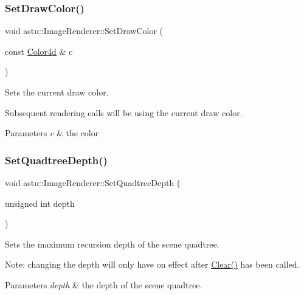 \subsubsection{\texorpdfstring{Set\+Draw\+Color()}{SetDrawColor()}}
{\footnotesize\ttfamily void astu\+::\+Image\+Renderer\+::\+Set\+Draw\+Color (\begin{DoxyParamCaption}\item[{const \hyperlink{classastu_1_1Color}{Color4d} \&}]{c }\end{DoxyParamCaption})\hspace{0.3cm}{\ttfamily [noexcept]}}

Sets the current draw color.

Subsequent rendering calls will be using the current draw color.


\begin{DoxyParams}{Parameters}
{\em c} & the color \\
\hline
\end{DoxyParams}
\mbox{\label{classastu_1_1ImageRenderer_af40c3c01ee3928fb7a8be816afe20eb5}} 
\subsubsection{\texorpdfstring{Set\+Quadtree\+Depth()}{SetQuadtreeDepth()}}
{\footnotesize\ttfamily void astu\+::\+Image\+Renderer\+::\+Set\+Quadtree\+Depth (\begin{DoxyParamCaption}\item[{unsigned int}]{depth }\end{DoxyParamCaption})}

Sets the maximum recursion depth of the scene quadtree.

Note\+: changing the depth will only have on effect after \hyperlink{classastu_1_1ImageRenderer_ae81b23f9e19254a7923cadf2a9e081a3}{Clear()} has been called.


\begin{DoxyParams}{Parameters}
{\em depth} & the depth of the scene quadtree. \\
\hline
\end{DoxyParams}
\mbox{\label{classastu_1_1ImageRenderer_a154491f8ef39881eeaba56f9d8ca24e8}} 
